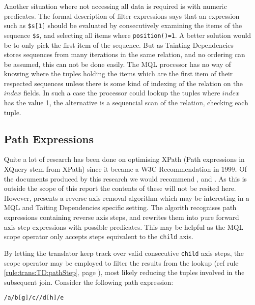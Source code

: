 Another situation where not accessing all data is required is with numeric predicates. The formal description of
filter expressions\cite{xquery_semantics} says that an expression such as
\texttt{\$s[1]} should be evaluated by consecutively examining the items of the sequence \texttt{\$s}, and selecting all items where
\texttt{position()=1}. A better solution would be to only pick the first item of the sequence. But as Tainting
Dependencies stores sequences from many iterations in the same relation, and no ordering can be assumed, this can
not be done easily. The MQL processor has no way of knowing where the tuples holding the items which are the
first item of their respected sequences unless there is some kind of indexing of the relation on the $index$
fields. In such a case the processor could lookup the tuples where $index$ has the value 1, the alternative is a
sequencial scan of the relation, checking each tuple.

\subsection{Path Expressions}
\label{sect:disc:optim:path}
Quite a lot of research has been done on optimising XPath (Path expressions in XQuery stem from XPath) since it
became a W3C Recommendation in 1999. Of the documents produced by this research we would recommend
\cite{optimize_logic}, \cite{optimize_michiels} and \cite{optimize_xsltPath}. As this is outside the scope of this
report the contents of these will not be resited here. However, \cite{optimize_forward} presents a reverse axis
removal algorithm which may be interesting in a MQL and Taiting Dependencies specific setting. The algorith
recognises path expressions containing reverse axis steps, and rewrites them into pure forward axis step
expressions with possible predicates. This may be helpful as the MQL \textsf{scope} operator only accepts steps
equivalent to the \texttt{child} axis.

By letting the translator keep track over valid consecutive \texttt{child} axis steps, the \textsf{scope} operator
may be employed to filter the results from the lookup (ref rule \ref{rule:trans:TD:pathStep}, page
\pageref{rule:trans:TD:pathStep}), most likely reducing the tuples involved in the subsequent join. Consider the
following path expression:

\begin{center}
\texttt{/a/b[g]/c//d[h]/e}
\end{center}

